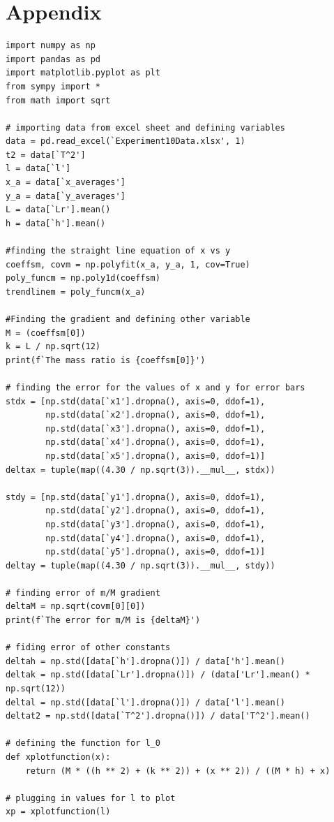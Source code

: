 \documentclass[12pt, a4paper]{article}
\begin{document}
\printbibliography[title = {References:}]

\section*{Appendix}
\begin{verbatim}
import numpy as np
import pandas as pd
import matplotlib.pyplot as plt
from sympy import *
from math import sqrt
 
# importing data from excel sheet and defining variables
data = pd.read_excel(`Experiment10Data.xlsx', 1)
t2 = data[`T^2']
l = data[`l']
x_a = data[`x_averages']
y_a = data[`y_averages']
L = data[`Lr'].mean()
h = data[`h'].mean()
 
#finding the straight line equation of x vs y
coeffsm, covm = np.polyfit(x_a, y_a, 1, cov=True)
poly_funcm = np.poly1d(coeffsm)
trendlinem = poly_funcm(x_a)
 
#Finding the gradient and defining other variable
M = (coeffsm[0])
k = L / np.sqrt(12)
print(f`The mass ratio is {coeffsm[0]}')
 
# finding the error for the values of x and y for error bars
stdx = [np.std(data[`x1'].dropna(), axis=0, ddof=1), 
        np.std(data[`x2'].dropna(), axis=0, ddof=1),
        np.std(data[`x3'].dropna(), axis=0, ddof=1), 
        np.std(data[`x4'].dropna(), axis=0, ddof=1),
        np.std(data[`x5'].dropna(), axis=0, ddof=1)]
deltax = tuple(map((4.30 / np.sqrt(3)).__mul__, stdx))
 
stdy = [np.std(data[`y1'].dropna(), axis=0, ddof=1), 
        np.std(data[`y2'].dropna(), axis=0, ddof=1),
        np.std(data[`y3'].dropna(), axis=0, ddof=1), 
        np.std(data[`y4'].dropna(), axis=0, ddof=1),
        np.std(data[`y5'].dropna(), axis=0, ddof=1)]
deltay = tuple(map((4.30 / np.sqrt(3)).__mul__, stdy))
 
# finding error of m/M gradient
deltaM = np.sqrt(covm[0][0])
print(f`The error for m/M is {deltaM}')
 
# fiding error of other constants
deltah = np.std([data[`h'].dropna()]) / data['h'].mean()
deltak = np.std([data[`Lr'].dropna()]) / (data['Lr'].mean() * np.sqrt(12))
deltal = np.std([data[`l'].dropna()]) / data['l'].mean()
deltat2 = np.std([data[`T^2'].dropna()]) / data['T^2'].mean()
 
# defining the function for l_0
def xplotfunction(x):
    return (M * ((h ** 2) + (k ** 2)) + (x ** 2)) / ((M * h) + x)
 
# plugging in values for l to plot
xp = xplotfunction(l)
 

\end{verbatim}
\end{document}
